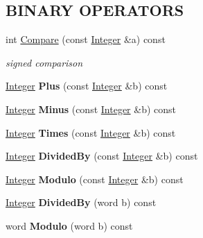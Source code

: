\subsection*{BINARY OPERATORS}
\label{_amgrp9e1d9554636126ae321e225d1d24c447}
 \begin{DoxyCompactItemize}
\item 
int \hyperlink{class_integer_a550cf80410789dc459df82387792ed49}{Compare} (const \hyperlink{class_integer}{Integer} \&a) const 
\begin{DoxyCompactList}\small\item\em signed comparison \item\end{DoxyCompactList}\item 
\hypertarget{class_integer_a9e294ba5adf2c733e4185fc9c497ff2a}{
\hyperlink{class_integer}{Integer} {\bfseries Plus} (const \hyperlink{class_integer}{Integer} \&b) const }
\label{class_integer_a9e294ba5adf2c733e4185fc9c497ff2a}

\item 
\hypertarget{class_integer_aaf500b571832a4a29315837c94ccada3}{
\hyperlink{class_integer}{Integer} {\bfseries Minus} (const \hyperlink{class_integer}{Integer} \&b) const }
\label{class_integer_aaf500b571832a4a29315837c94ccada3}

\item 
\hypertarget{class_integer_aa7547efdb8c45c6b033bfb1a0d5141e6}{
\hyperlink{class_integer}{Integer} {\bfseries Times} (const \hyperlink{class_integer}{Integer} \&b) const }
\label{class_integer_aa7547efdb8c45c6b033bfb1a0d5141e6}

\item 
\hypertarget{class_integer_a9a6d4284d05d6377cbf6a07611a57545}{
\hyperlink{class_integer}{Integer} {\bfseries DividedBy} (const \hyperlink{class_integer}{Integer} \&b) const }
\label{class_integer_a9a6d4284d05d6377cbf6a07611a57545}

\item 
\hypertarget{class_integer_a850606c271d06678f98c98ecc0f0ac23}{
\hyperlink{class_integer}{Integer} {\bfseries Modulo} (const \hyperlink{class_integer}{Integer} \&b) const }
\label{class_integer_a850606c271d06678f98c98ecc0f0ac23}

\item 
\hypertarget{class_integer_a16dab535de7a1ce00f2cb84da79d88db}{
\hyperlink{class_integer}{Integer} {\bfseries DividedBy} (word b) const }
\label{class_integer_a16dab535de7a1ce00f2cb84da79d88db}

\item 
\hypertarget{class_integer_a50e1b59012582912ff015cc083d50a50}{
word {\bfseries Modulo} (word b) const }
\label{class_integer_a50e1b59012582912ff015cc083d50a50}


\end{DoxyCompactItemize}
